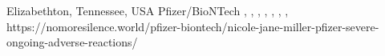           {Elizabethton, Tennessee, USA}
          {}
          {Pfizer/BioNTech}
          {, }
          {,
           ,
           ,
           ,
           ,
           ,
          }
          {https://nomoresilence.world/pfizer-biontech/nicole-jane-miller-pfizer-severe-ongoing-adverse-reactions/}
